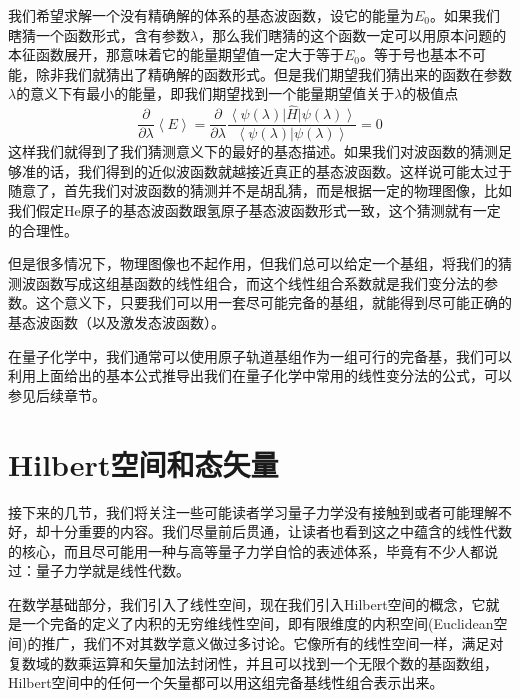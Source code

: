 \documentclass[12pt,a4paper,openany,twoside]{book}
\numberwithin{equation}{section}
\begin{document}
          我们希望求解一个没有精确解的体系的基态波函数，设它的能量为$E_0$。如果我们瞎猜一个函数形式，含有参数$\lambda$，那么我们瞎猜的这个函数一定可以用原本问题的本征函数展开，那意味着它的能量期望值一定大于等于$E_0$。等于号也基本不可能，除非我们就猜出了精确解的函数形式。但是我们期望我们猜出来的函数在参数$\lambda$的意义下有最小的能量，即我们期望找到一个能量期望值关于$\lambda$的极值点
          \begin{equation}
            \frac{\partial}{\partial \lambda}\left\langle E\right\rangle =  \frac{\partial}{\partial \lambda} \frac{\left\langle\psi(\lambda)\right|\hat{H}\left|\psi(\lambda)\right\rangle}{\left\langle\psi(\lambda)\right.\left|\psi(\lambda)\right\rangle}=0
          \end{equation}
          这样我们就得到了我们猜测意义下的最好的基态描述。如果我们对波函数的猜测足够准的话，我们得到的近似波函数就越接近真正的基态波函数。这样说可能太过于随意了，首先我们对波函数的猜测并不是胡乱猜，而是根据一定的物理图像，比如我们假定He原子的基态波函数跟氢原子基态波函数形式一致，这个猜测就有一定的合理性。

          但是很多情况下，物理图像也不起作用，但我们总可以给定一个基组，将我们的猜测波函数写成这组基函数的线性组合，而这个线性组合系数就是我们变分法的参数。这个意义下，只要我们可以用一套尽可能完备的基组，就能得到尽可能正确的基态波函数（以及激发态波函数）。

          在量子化学中，我们通常可以使用原子轨道基组作为一组可行的完备基，我们可以利用上面给出的基本公式推导出我们在量子化学中常用的线性变分法的公式，可以参见后续章节。
      \section{Hilbert空间和态矢量}
        接下来的几节，我们将关注一些可能读者学习量子力学没有接触到或者可能理解不好，却十分重要的内容。我们尽量前后贯通，让读者也看到这之中蕴含的线性代数的核心，而且尽可能用一种与高等量子力学自恰的表述体系，毕竟有不少人都说过：量子力学就是线性代数。

        在数学基础部分，我们引入了线性空间，现在我们引入Hilbert空间的概念，它就是一个完备的定义了内积的无穷维线性空间，即有限维度的内积空间(Euclidean空间)的推广，我们不对其数学意义做过多讨论。它像所有的线性空间一样，满足对复数域的数乘运算和矢量加法封闭性，并且可以找到一个无限个数的基函数组，Hilbert空间中的任何一个矢量都可以用这组完备基线性组合表示出来。
\end{document}
